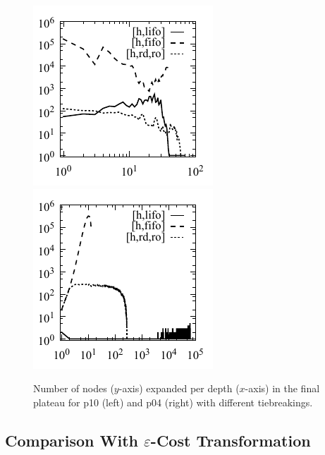 
\begin{figure}[tb]
 \centering {}
 \hfill
 \includegraphics{tables/aaai16-log-rd/aaai16prelim3/depth-histogram-openstacks-opt11-strips-p10.pdf}
 \hfill
 \includegraphics{tables/aaai16-log-rd/2zerocost/depth-histogram-woodworking-cut-p04.pdf}
 \hfill
 \caption{Number of nodes ($y$-axis) expanded per depth ($x$-axis) in
 the final plateau for 
  p10 
 (left)
 and
  p04
 (right)
 with different tiebreakings.
 }
 \label{fig:depth-histogram}
\end{figure}

\subsection{Comparison With $\varepsilon$-Cost Transformation}

